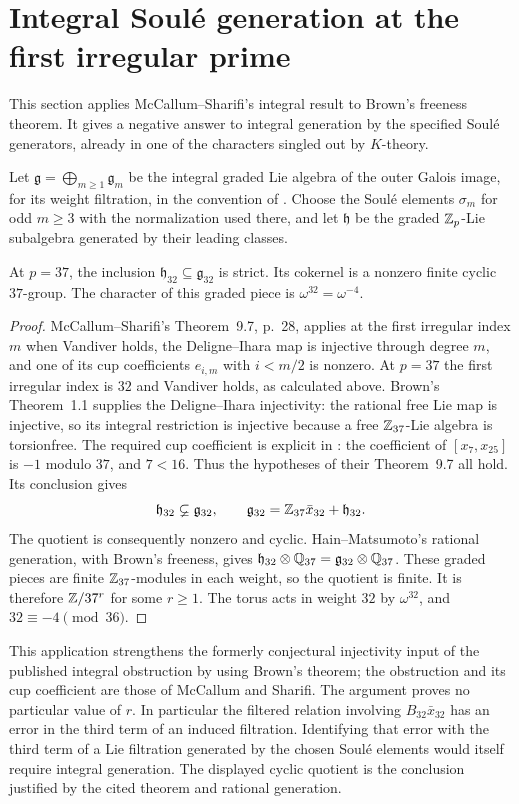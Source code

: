 \section{Integral Soul\'e generation at the first irregular prime}
\label{sec:integral}

This section applies McCallum--Sharifi's integral result to Brown's
freeness theorem. It gives a negative answer to integral generation
by the specified Soul\'e generators, already in one of the
characters singled out by $K$-theory.

Let $\mathfrak g=\bigoplus_{m\geq1}\mathfrak g_m$ be the
integral graded Lie algebra of the outer Galois image, for its
weight filtration, in the convention of
\cite[\S9, pp.~24--28]{MS}. Choose the Soul\'e elements
$\sigma_m$ for odd $m\geq3$ with the normalization used there,
and let $\mathfrak h$ be the graded $\mathbb Z_p$-Lie subalgebra
generated by their leading classes.

\begin{proposition}\label{prop:integral37}
At $p=37$, the inclusion $\mathfrak h_{32}\subseteq
\mathfrak g_{32}$ is strict. Its cokernel is a nonzero finite
cyclic $37$-group. The character of this graded piece is
$\omega^{32}=\omega^{-4}$.
\end{proposition}
\begin{proof}
McCallum--Sharifi's Theorem~9.7, p.~28, applies at the first
irregular index $m$ when Vandiver holds, the Deligne--Ihara
map is injective through degree $m$, and one of its cup
coefficients $e_{i,m}$ with $i<m/2$ is nonzero.
At $p=37$ the first irregular index is $32$ and Vandiver
holds, as calculated above. Brown's Theorem~1.1 supplies
the Deligne--Ihara injectivity: the rational free Lie map
is injective, so its integral restriction is injective
because a free $\mathbb Z_{37}$-Lie algebra is torsionfree.
The required cup coefficient is explicit in
\cite[Corollary~8.3, p.~23]{MS}: the coefficient of
$[x_7,x_{25}]$ is $-1$ modulo $37$, and $7<16$.
Thus the hypotheses of their Theorem~9.7 all hold.
Its conclusion gives
\[
 \mathfrak h_{32}\varsubsetneq\mathfrak g_{32},
 \qquad
 \mathfrak g_{32}=\mathbb Z_{37}\bar x_{32}+\mathfrak h_{32}.
\]
The quotient is consequently nonzero and cyclic.
Hain--Matsumoto's rational generation, with Brown's
freeness, gives
$\mathfrak h_{32}\otimes\mathbb Q_{37}
 =\mathfrak g_{32}\otimes\mathbb Q_{37}$.
These graded pieces are finite $\mathbb Z_{37}$-modules in
each weight, so the quotient is finite. It is therefore
$\mathbb Z/37^r$ for some $r\geq1$.
The torus acts in weight $32$ by $\omega^{32}$, and
$32\equiv-4\pmod{36}$.
\end{proof}

This application strengthens the formerly conjectural
injectivity input of the published integral obstruction
by using Brown's theorem; the obstruction and its cup
coefficient are those of McCallum and Sharifi.
The argument proves no particular value of $r$.
In particular the filtered relation involving
$B_{32}\bar x_{32}$ has an error in the third term of an
induced filtration. Identifying that error with the
third term of a Lie filtration generated by the chosen
Soul\'e elements would itself require integral generation.
The displayed cyclic quotient is the conclusion justified
by the cited theorem and rational generation.
